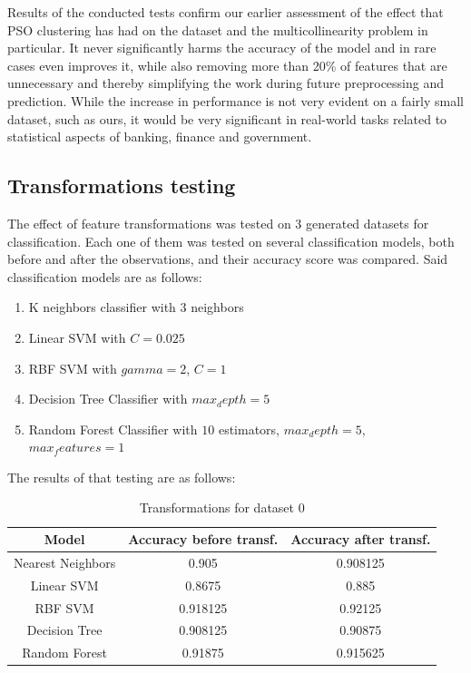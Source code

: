 \documentclass[conference]{IEEEtran}
\begin{document}
Results of the conducted tests confirm our earlier assessment of the effect that PSO clustering has had on the dataset and the multicollinearity problem in particular. It never significantly harms the accuracy of the model and in rare cases even improves it, while also removing more than 20\% of features that are unnecessary and thereby simplifying the work during future preprocessing and prediction. While the increase in performance is not very evident on a fairly small dataset, such as ours, it would be very significant in real-world tasks related to statistical aspects of banking, finance and government.  

\subsection{Transformations testing}

The effect of feature transformations was tested on 3 generated datasets for classification. Each one of them was tested on several classification models, both before and after the observations, and their accuracy score was compared. Said classification models are as follows: 

\begin{enumerate}
	\item K neighbors classifier with 3 neighbors
	\item Linear SVM with $C=0.025$
	\item RBF SVM with $gamma = 2$, $C = 1$
	\item Decision Tree Classifier with $max_depth = 5$
	\item Random Forest Classifier with $10$ estimators, $max_depth=5$, $max_features=1$
\end{enumerate}

The results of that testing are as follows:

\begin{table}[hbt!]
	\caption{Transformations for dataset 0}
	\begin{center}
		\begin{tabular}{|c|c|c|}
			\hline
			\textbf{Model}&\textbf{Accuracy before transf.}&\textbf{Accuracy after transf.} \\
			\hline
			Nearest Neighbors&0.905&0.908125 \\
			\hline
			Linear SVM&0.8675&0.885 \\
			\hline
			RBF SVM&0.918125&0.92125 \\
			\hline
			Decision Tree&0.908125&0.90875 \\
			\hline
			Random Forest&0.91875&0.915625 \\
			\hline
		\end{tabular}
		\label{tab3}
	\end{center}
\end{table}
\end{document}
